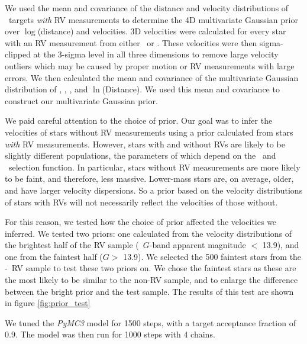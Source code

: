 We used the mean and covariance of the distance and velocity distributions of
\kepler\ targets {\it with} RV measurements to determine the 4D multivariate
Gaussian prior over $\log$(distance) and velocities.
3D velocities were calculated for every star with an RV measurement from
either \gaia\ or \lamost.
These velocities were then sigma-clipped at the 3-sigma level in all three
dimensions to remove large velocity outliers which may be caused by proper
motion or RV measurements with large errors.
We then calculated the mean and covariance of the multivariate Gaussian
distribution of \vx, \vy, \vz, and $\ln$(Distance).
We used this mean and covariance to construct our multivariate Gaussian prior.

We paid careful attention to the choice of prior.
Our goal was to infer the velocities of stars without RV measurements using a
prior calculated from stars {\it with} RV measurements.
However, stars with and without RVs are likely to be slightly different
populations, the parameters of which depend on the \gaia\ and \lamost\
selection function.
In particular, stars without RV measurements are more likely to be faint, and
therefore, less massive.
Lower-mass stars are, on average, older, and have larger velocity dispersions.
So a prior based on the velocity distributions of stars with RVs will not
necessarily reflect the velocities of those without.

For this reason, we tested how the choice of prior affected the velocities we
inferred.
We tested two priors: one calculated from the velocity distributions of the
brightest half of the RV sample (\gaia\ $G$-band apparent magnitude $<$ 13.9),
and one from the faintest half ($G > $ 13.9).
We selected the 500 faintest stars from the \gaia-\lamost\ RV sample to test
these two priors on.
We chose the faintest stars as these are the most likely to be similar to the
non-RV sample, and to enlarge the difference between the bright prior and the
test sample.
The results of this test are shown in figure \ref{fig:prior_test}

We tuned the {\it PyMC3} model for 1500 steps, with a target acceptance
fraction of 0.9.
The model was then run for 1000 steps with 4 chains.

